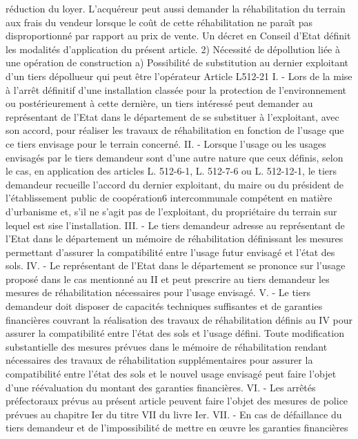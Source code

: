 \documentclass[11pt,a4paper]{report}
\begin{document}
	réduction du loyer. L'acquéreur peut aussi demander la réhabilitation du terrain aux frais du vendeur lorsque le
	coût de cette réhabilitation ne paraît pas disproportionné par rapport au prix de vente.
	Un décret en Conseil d'Etat définit les modalités d'application du présent article.
	2) Nécessité de dépollution liée à une opération de construction
	a) Possibilité de substitution au dernier exploitant d’un tiers dépollueur qui peut être l’opérateur
	Article L512-21
	I. - Lors de la mise à l'arrêt définitif d'une installation classée pour la protection de l'environnement ou
	postérieurement à cette dernière, un tiers intéressé peut demander au représentant de l'Etat dans le département
	de se substituer à l'exploitant, avec son accord, pour réaliser les travaux de réhabilitation en fonction de l'usage
	que ce tiers envisage pour le terrain concerné.
	II. - Lorsque l'usage ou les usages envisagés par le tiers demandeur sont d'une autre nature que ceux définis,
	selon le cas, en application des articles L. 512-6-1, L. 512-7-6 ou L. 512-12-1, le tiers demandeur recueille
	l'accord du dernier exploitant, du maire ou du président de l'établissement public de coopération6
	intercommunale compétent en matière d'urbanisme et, s'il ne s'agit pas de l'exploitant, du propriétaire du terrain
	sur lequel est sise l'installation.
	III. - Le tiers demandeur adresse au représentant de l'Etat dans le département un mémoire de réhabilitation
	définissant les mesures permettant d'assurer la compatibilité entre l'usage futur envisagé et l'état des sols.
	IV. - Le représentant de l'Etat dans le département se prononce sur l'usage proposé dans le cas mentionné au II
	et peut prescrire au tiers demandeur les mesures de réhabilitation nécessaires pour l'usage envisagé.
	V. - Le tiers demandeur doit disposer de capacités techniques suffisantes et de garanties financières couvrant la
	réalisation des travaux de réhabilitation définis au IV pour assurer la compatibilité entre l'état des sols et
	l'usage défini.
	Toute modification substantielle des mesures prévues dans le mémoire de réhabilitation rendant nécessaires des
	travaux de réhabilitation supplémentaires pour assurer la compatibilité entre l'état des sols et le nouvel usage
	envisagé peut faire l'objet d'une réévaluation du montant des garanties financières.
	VI. - Les arrêtés préfectoraux prévus au présent article peuvent faire l'objet des mesures de police prévues au
	chapitre Ier du titre VII du livre Ier.
	VII. - En cas de défaillance du tiers demandeur et de l'impossibilité de mettre en œuvre les garanties financières
\end{document}
